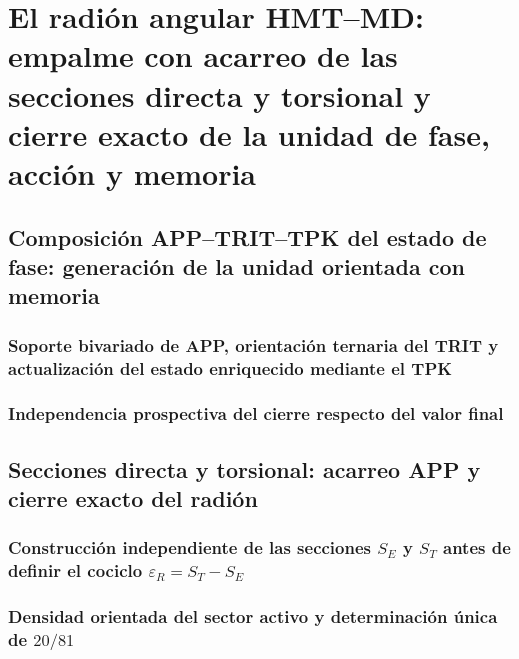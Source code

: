 


\chapter{El radión angular HMT--MD: empalme con acarreo de las secciones directa y torsional y cierre exacto de la unidad de fase, acción y memoria}
\label{chap:sucesor-102-radion}

\section{Composición APP--TRIT--TPK del estado de fase: generación de la unidad orientada con memoria}


\subsection{Soporte bivariado de APP, orientación ternaria del TRIT y actualización del estado enriquecido mediante el TPK}


\subsection{Independencia prospectiva del cierre respecto del valor final}


\section{Secciones directa y torsional: acarreo APP y cierre exacto del radión}
\subsection{Construcción independiente de las secciones \(S_E\) y \(S_T\) antes de definir el cociclo \(\varepsilon_R=S_T-S_E\)}

\subsection{Densidad orientada del sector activo y determinación única de \(20/81\)}

